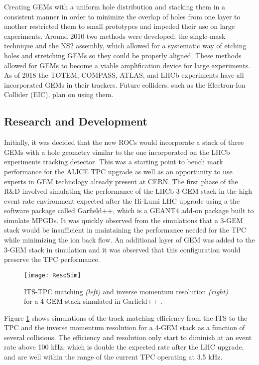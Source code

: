 Creating GEMs with a uniform hole distribution and stacking them in a consistent manner in order to minimize the overlap of holes from one layer to another restricted them to small prototypes and impeded their use on large experiments.  Around 2010 two methods were developed, the single-mask technique\cite{0960-1317-17-8-021} and the NS2 assembly\cite{1748-0221-12-06-C06036}, which allowed for a systematic way of etching holes and stretching GEMs so they could be properly aligned.  These methods allowed for GEMs to become a viable amplification device for large experiments.  As of 2018 the TOTEM, COMPASS, ATLAS, and LHCb experiments have all incorporated GEMs in their trackers.  Future colliders, such as the Electron-Ion Collider (EIC), plan on using them\cite{SAULI20162}.


\subsection{Research and Development}

Initially, it was decided that the new ROCs would incorporate a stack of three GEMs with a hole geometry similar to the one incorporated on the LHCb experiments\cite{Santimaria:1690550} tracking detector.  This was a starting point to bench mark performance for the ALICE TPC upgrade as well as an opportunity to use experts in GEM technology already present at CERN.  The first phase of the R\&D involved simulating the performance of the LHCb 3-GEM stack in the high event rate environment expected  after the Hi-Lumi LHC upgrade using a the software package called Garfield++\cite{Pfeiffer:2628608}, which is a GEANT4\cite{Agostinelli:2002hh} add-on package built to simulate MPGDs.  It was quickly observed from the simulations that a 3-GEM stack would be insufficient in maintaining the performance needed for the TPC while minimizing the ion back flow.  An additional layer of GEM was added to the 3-GEM stack in simulation and it was observed that this configuration would preserve the TPC performance.

\begin{figure}[h]
\texttt{[image: ResoSim]}
\centering
\caption{ITS-TPC matching  \textit{(left)} and inverse momentum resolution \textit{(right)} for a 4-GEM stack simulated in Garfield++ \cite{Dick2017QM}. }
\label{fig:ResoSim}
\end{figure}

\noindent
Figure \ref{fig:ResoSim} shows simulations of the track matching efficiency from the ITS to the TPC and the inverse momentum resolution for a 4-GEM stack as a function of several collisions.  The efficiency and resolution only start to diminish at an event rate above 100 kHz, which is double the expected rate after the LHC upgrade, and are well within the range of the current TPC operating at 3.5 kHz.
 
